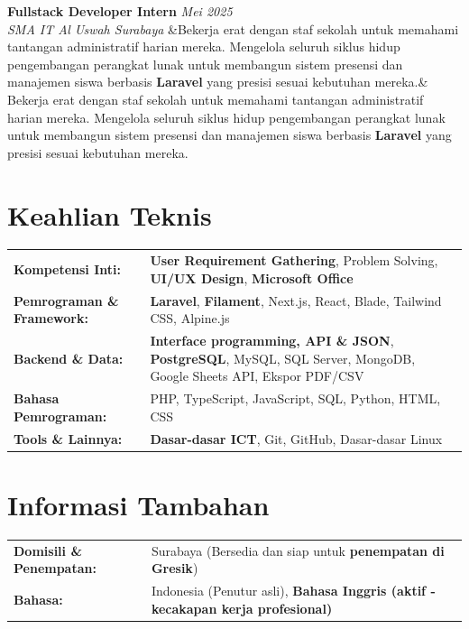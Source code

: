 \documentclass[a4paper,11pt]{article}
\newcommand{\cventry}[4]{%
  \noindent\textbf{#1} \hfill \textit{#3} \\
  \textit{#2}
  \ifx&#4& \else \\ \small #4 \fi
  \vspace{6pt}
}
\begin{document}
\cventry
  {Fullstack Developer Intern}
  {SMA IT Al Uswah Surabaya}
  {Mei 2025}
  {Bekerja erat dengan staf sekolah untuk memahami tantangan administratif harian mereka. Mengelola seluruh siklus hidup pengembangan perangkat lunak untuk membangun sistem presensi dan manajemen siswa berbasis \textbf{Laravel} yang presisi sesuai kebutuhan mereka.}

\section{Keahlian Teknis}
\begin{tabularx}{\textwidth}{@{}l X@{}}
\textbf{Kompetensi Inti:} & \textbf{User Requirement Gathering}, Problem Solving, \textbf{UI/UX Design}, \textbf{Microsoft Office} \\[3pt]
\textbf{Pemrograman \& Framework:} & \textbf{Laravel}, \textbf{Filament}, Next.js, React, Blade, Tailwind CSS, Alpine.js \\[3pt]
\textbf{Backend \& Data:} & \textbf{Interface programming, API \& JSON}, \textbf{PostgreSQL}, MySQL, SQL Server, MongoDB, Google Sheets API, Ekspor PDF/CSV \\[3pt]
\textbf{Bahasa Pemrograman:} & PHP, TypeScript, JavaScript, SQL, Python, HTML, CSS \\[3pt]
\textbf{Tools \& Lainnya:} & \textbf{Dasar-dasar ICT}, Git, GitHub, Dasar-dasar Linux \\
\end{tabularx}

\section{Informasi Tambahan}
\begin{tabularx}{\textwidth}{@{}l X@{}}
\textbf{Domisili \& Penempatan:} & Surabaya (Bersedia dan siap untuk \textbf{penempatan di Gresik}) \\[3pt]
\textbf{Bahasa:} & Indonesia (Penutur asli), \textbf{Bahasa Inggris (aktif - kecakapan kerja profesional)} \\
\end{tabularx}
\end{document}

